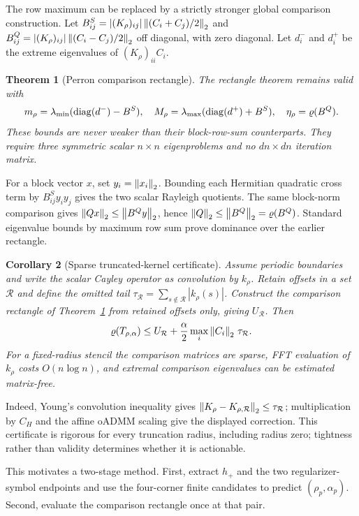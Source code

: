 \documentclass[pdflatex,iicol,sn-mathphys-num]{sn-jnl}
\newtheorem{theorem}{Theorem}[section]
\newtheorem{corollary}[theorem]{Corollary}\newtheorem{assumption}[theorem]{Assumption}
\theoremstyle{definition}\newtheorem{definition}[theorem]{Definition}\newtheorem{remark}[theorem]{Remark}
\begin{document}
The row maximum can be replaced by a strictly stronger global comparison construction.  Let $B^S_{ij}=|(K_\rho)_{ij}|\left\lVert (C_i+C_j)/2\right\rVert_2$ and $B^Q_{ij}=|(K_\rho)_{ij}|\left\lVert (C_i-C_j)/2\right\rVert_2$ off diagonal, with zero diagonal.  Let $d_i^-$ and $d_i^+$ be the extreme eigenvalues of $(K_\rho)_{ii}C_i$.

\begin{theorem}[Perron comparison rectangle]\label{thm:comparison}
The rectangle theorem remains valid with
\[
m_\rho=\lambda_{\min}(\operatorname{diag}(d^-)-B^S),\quad
M_\rho=\lambda_{\max}(\operatorname{diag}(d^+)+B^S),\quad
\eta_\rho=\varrho(B^Q).
\]
These bounds are never weaker than their block-row-sum counterparts.  They require three symmetric scalar $n\times n$ eigenproblems and no $dn\times dn$ iteration matrix.
\end{theorem}
For a block vector $x$, set $y_i=\left\lVert x_i\right\rVert_2$.  Bounding each Hermitian quadratic cross term by $B^S_{ij}y_iy_j$ gives the two scalar Rayleigh quotients.  The same block-norm comparison gives $\left\lVert Qx\right\rVert_2\le\left\lVert B^Qy\right\rVert_2$, hence $\left\lVert Q\right\rVert_2\le\left\lVert B^Q\right\rVert_2=\varrho(B^Q)$.  Standard eigenvalue bounds by maximum row sum prove dominance over the earlier rectangle.

\begin{corollary}[Sparse truncated-kernel certificate]\label{cor:truncated_kernel}
Assume periodic boundaries and write the scalar Cayley operator as convolution
by $k_\rho$.  Retain offsets in a set $\mathcal R$ and define the omitted
tail $\tau_\mathcal R=\sum_{s\notin\mathcal R}|k_\rho(s)|$.  Construct the
comparison rectangle of Theorem~\ref{thm:comparison} from retained offsets
only, giving $U_\mathcal R$.  Then
\[
 \varrho(T_{\rho,\alpha})\le U_\mathcal R+
 \frac{\alpha}{2}\max_i\left\lVert C_i\right\rVert_2\,\tau_\mathcal R.
\]
For a fixed-radius stencil the comparison matrices are sparse, FFT evaluation
of $k_\rho$ costs $O(n\log n)$, and extremal comparison eigenvalues can be
estimated matrix-free.
\end{corollary}
Indeed, Young's convolution inequality gives
$\left\lVert K_\rho-K_{\rho,\mathcal R}\right\rVert_2\le\tau_\mathcal R$; multiplication by
$C_H$ and the affine oADMM scaling give the displayed correction.  This
certificate is rigorous for every truncation radius, including radius zero;
tightness rather than validity determines whether it is actionable.

This motivates a two-stage method.  First, extract $h_+$ and the two regularizer-symbol endpoints and use the four-corner finite candidates to predict $(\rho_p,\alpha_p)$.  Second, evaluate the comparison rectangle once at that pair.
\end{document}
